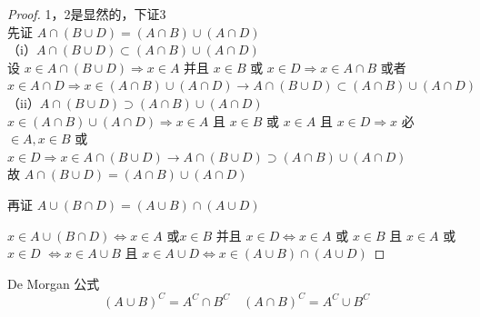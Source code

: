\begin{proof}
	1，2是显然的，下证3\\
	先证 $A \cap(B \cup D)=(A \cap B) \cup(A \cap D)$
	\\（i）$A \cap(B \cup D) \subset(A \cap B) \cup(A \cap D)$\\
	设 $x \in A \cap(B \cup D) \Rightarrow x \in A$ 并且 $x \in B$ 或 $x \in D \Rightarrow x \in A \cap B$ 或者 $x \in A \cap D \Rightarrow x \in(A \cap B) \cup(A \cap D) \rightarrow A \cap(B \cup D) \subset(A \cap B) \cup(A \cap D)$ \\（ii）$A \cap(B \cup D) \supset( A \cap B) \cup(A \cap D)$\\
	$x \in(A \cap B) \cup(A \cap D) \Rightarrow x \in A$ 且 $x \in B$ 或 $x \in A$ 且 $x \in D \Rightarrow x$ 必 $\in A, x \in B$ 或 $x \in D \Rightarrow x \in A \cap(B \cup D) \rightarrow A \cap(B \cup D) \supset(A \cap B) \cup(A \cap D)$\\故 $A \cap(B \cup D)=(A \cap B) \cup(A \cap D)$
	
	再证 $A \cup(B \cap D)=(A \cup B) \cap(A \cup D)$
	
	$x \in A \cup(B \cap D) \Leftrightarrow x \in A$ 或$x \in B$ 并且 $x \in D \Leftrightarrow x \in A$ 或 $x \in B$ 且 $x \in A$ 或 $x \in D$
	$\Leftrightarrow x \in A \cup B$ 且 $x \in A \cup D \Leftrightarrow x \in(A \cup B) \cap(A \cup D)$
	
	
\end{proof}
\begin{proposition}
	De Morgan 公式
	$$
	(A \cup B)^C=A^C \cap B^C \quad(A \cap B)^C=A^C \cup B^C
	$$
	\label{demordan}
\end{proposition}

